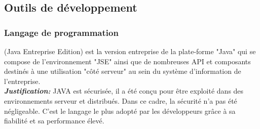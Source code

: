 \subsection{Outils de développement }
\subsubsection{Langage de programmation}
\begin{minipage}{0.18\textwidth}
	\begin{minipage}{\linewidth}
		\label{f3}%
\end{minipage}
\end{minipage}
\hfill
\begin{minipage}{0.75\textwidth}
(Java Entreprise Edition) est la version entreprise de la plate-forme "Java" qui se compose de l'environnement "JSE" ainsi que de nombreuses API et composants destinés à une utilisation "côté serveur" au sein du système d'information de l'entreprise.\\

\textbf{\textit{Justification:}} JAVA est sécurisée, il a été conçu pour être exploité dans des environnements serveur et distribués. Dans ce cadre, la sécurité n’a pas été négligeable. C’est le langage le plus adopté par les développeurs grâce à sa fiabilité et sa performance élevé. \\
\end{minipage}\\

